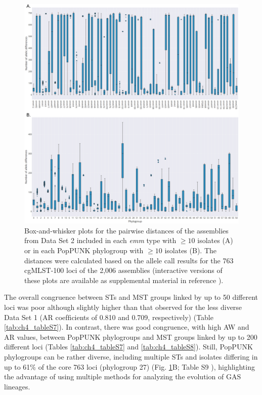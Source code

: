 \newpage
\begin{figure}[h!]
    \centering
    \includegraphics[width=\textwidth]{figures/chapter 4/Figure3.pdf}
    \caption[Box-and-whisker plots for the pairwise distances of the assemblies from Data Set 2 included in each \textit{emm} type with $\geq10$ isolates.]{Box-and-whisker plots for the pairwise distances of the assemblies from Data Set 2 \cite{davies_atlas_2019, friaes_supplemental_2023} included in each \textit{emm} type with $\geq10$ isolates (A) or in each PopPUNK phylogroup with $\geq10$ isolates (B). The distances were calculated based on the allele call results for the 763 cgMLST-100 loci of the 2,006 assemblies (interactive versions of these plots are available as supplemental material in reference \cite{friaes_supplemental_2023}).}
    \label{fig:chap4_figure3}
\end{figure}

The overall congruence between \ac{ST}s and \ac{MST} groups linked by up to 50 different loci was poor although slightly higher than that observed for the less diverse Data Set 1 (\ac{AR} coefﬁcients of 0.810 and 0.709, respectively) (Table \ref{tab:ch4_tableS7}). In contrast, there was good congruence, with high \ac{AW} and \ac{AR} values, between \ac{PopPUNK} phylogroups and \ac{MST} groups linked by up to 200 different loci (Tables \ref{tab:ch4_tableS7} and \ref{tab:ch4_tableS8}). Still, \ac{PopPUNK} phylogroups can be rather diverse, including multiple \ac{ST}s and isolates differing in up to 61\% of the core 763 loci (phylogroup 27) (Fig. \ref{fig:chap4_figure3}B; Table S9 \cite{friaes_supplemental_2023}), highlighting the advantage of using multiple methods for analyzing the evolution of \ac{GAS} lineages.


